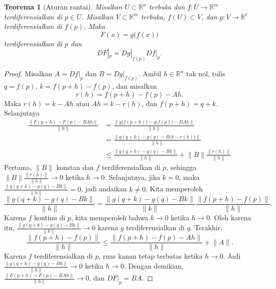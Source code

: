 \documentclass[12pt,openany]{book}
\newcommand{\snorm}[1]{\lVert {#1} \rVert}
\newcommand{\bnorm}[1]{\bigl\lVert {#1} \bigr\rVert}
\newcommand{\R}{{\mathbb{R}}}
\theoremstyle{plain}
\newtheorem{thm}{Teorema}[section]
\theoremstyle{remark}
\theoremstyle{definition}
\theoremstyle{exercise}
\theoremstyle{example}
\begin{document}
\begin{thm}[Aturan rantai] \label{thm:realchain}
Misalkan $U \subset \R^n$ terbuka dan $f \colon U \to \R^m$
terdiferensialkan di $p \in U$.  Misalkan $V \subset \R^m$ terbuka,
$f(U) \subset V$, dan $g \colon V \to \R^\ell$ terdiferensialkan
di $f(p)$.  Maka
\begin{equation*}
F(x) = g\bigl(f(x)\bigr)
\end{equation*}
terdiferensialkan di $p$ dan
\begin{equation*}
DF|_p = Dg|_{f(p)} Df|_p .
\end{equation*}
\end{thm}

\begin{proof}
Misalkan $A = Df|_p$ dan $B = Dg|_{f(p)}$.  Ambil $h \in \R^n$ tak nol,
tulis $q = f(p)$, $k = f(p+h)-f(p)$, dan misalkan
\begin{equation*}
r(h) = f(p+h)-f(p) - A h .
\end{equation*}
Maka $r(h) = k-Ah$ atau $Ah = k-r(h)$, dan $f(p+h) = q+k$.
Selanjutnya
\begin{equation*}
\begin{split}
\frac{\snorm{F(p+h)-F(p) - BAh}}{\snorm{h}}
& =
\frac{\bnorm{g\bigl(f(p+h)\bigr)-g\bigl(f(p)\bigr) - BAh}}{\snorm{h}}
\\
& =
\frac{\bnorm{g(q+k)-g(q) - B\bigl(k-r(h)\bigr)}}{\snorm{h}}
\\
& \leq
\frac
{\snorm{g(q+k)-g(q) - Bk}}
{\snorm{h}}
+
\snorm{B}
\frac
{\snorm{r(h)}}
{\snorm{h}}
\end{split}
\end{equation*}
Pertama, $\snorm{B}$ konstan dan $f$ terdiferensialkan di $p$,
sehingga
$\snorm{B}\frac{\snorm{r(h)}}{\snorm{h}} \to 0$
ketika $h \to 0$.
Selanjutnya,
jika $k=0$, maka $\frac
{\snorm{g(q+k)-g(q) - Bk}}
{\snorm{h}} = 0$, jadi andaikan $k \neq 0$.  Kita memperoleh
\begin{equation*}
\frac
{\snorm{g(q+k)-g(q) - Bk}}
{\snorm{h}}
=
\frac
{\snorm{g(q+k)-g(q) - Bk}}
{\snorm{k}}
\frac
{\snorm{f(p+h)-f(p)}}
{\snorm{h}} .
\end{equation*}
Karena $f$ kontinu di $p$, kita memperoleh bahwa
$k \to 0$ ketika
$h \to 0$.
Oleh karena itu,
$\frac
{\snorm{g(q+k)-g(q) - Bk}}
{\snorm{k}} \to 0$ karena $g$ terdiferensialkan di $q$.
Terakhir,
\begin{equation*}
\frac
{\snorm{f(p+h)-f(p)}}
{\snorm{h}}
\leq
\frac
{\snorm{f(p+h)-f(p)-Ah}}
{\snorm{h}}
+
\snorm{A} .
\end{equation*}
Karena $f$ terdiferensialkan di $p$,
ruas kanan tetap terbatas ketika $h \to 0$.
Jadi
$\frac
{\snorm{g(q+k)-g(q) - Bk}}
{\snorm{h}} \to 0$ ketika $h \to 0$.
Dengan demikian,
$\frac{\snorm{F(p+h)-F(p) - BAh}}{\snorm{h}} \to 0$, dan
$DF|_p = BA$.
\end{proof}
\end{document}
